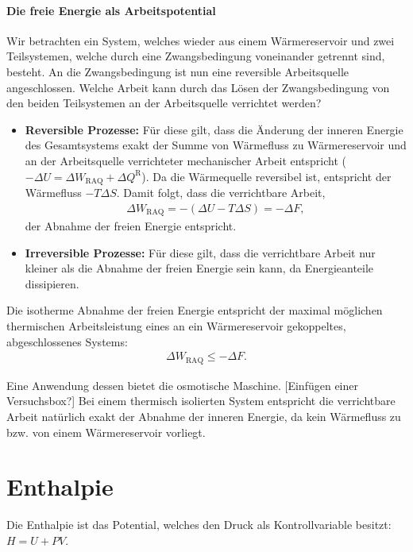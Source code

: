 \paragraph*{Die freie Energie als Arbeitspotential}
Wir betrachten ein System, welches wieder aus einem Wärmereservoir und zwei Teilsystemen, welche durch eine Zwangsbedingung voneinander getrennt sind, besteht. An die Zwangsbedingung ist nun eine reversible Arbeitsquelle angeschlossen. Welche Arbeit kann durch das Lösen der Zwangsbedingung von den beiden Teilsystemen an der Arbeitsquelle verrichtet werden? 
\begin{itemize}
    \item \textbf{Reversible Prozesse:} Für diese gilt, dass die Änderung der inneren Energie des Gesamtsystems exakt der Summe von Wärmefluss zu Wärmereservoir und an der Arbeitsquelle verrichteter mechanischer Arbeit entspricht ($-\Delta U=\Delta W_\mathrm{RAQ}+\Delta Q^\mathrm{R}$). 
    Da die Wärmequelle reversibel ist, entspricht der Wärmefluss $-T\Delta S$. Damit folgt, dass die verrichtbare Arbeit, 
    \begin{align*}
        \Delta W_\mathrm{RAQ}=-(\Delta U-T\Delta S)=-\Delta F,
    \end{align*}
    der Abnahme der freien Energie entspricht.
    \item \textbf{Irreversible Prozesse:} Für diese gilt, dass die verrichtbare Arbeit nur kleiner als die Abnahme der freien Energie sein kann, da Energieanteile dissipieren.
\end{itemize}
\begin{formal}
    Die isotherme Abnahme der freien Energie entspricht der maximal möglichen thermischen Arbeitsleistung eines an ein Wärmereservoir gekoppeltes, abgeschlossenes Systems:
    \begin{align*}
        \Delta W_\mathrm{RAQ}\leq -\Delta F.
    \end{align*}
\end{formal}
Eine Anwendung dessen bietet die osmotische Maschine. [Einfügen einer Versuchsbox?]
Bei einem thermisch isolierten System entspricht die verrichtbare Arbeit natürlich exakt der Abnahme der inneren Energie, da kein Wärmefluss zu bzw. von einem Wärmereservoir vorliegt.

\section{Enthalpie}
Die Enthalpie ist das Potential, welches den Druck als Kontrollvariable besitzt: $H=U+PV$.

